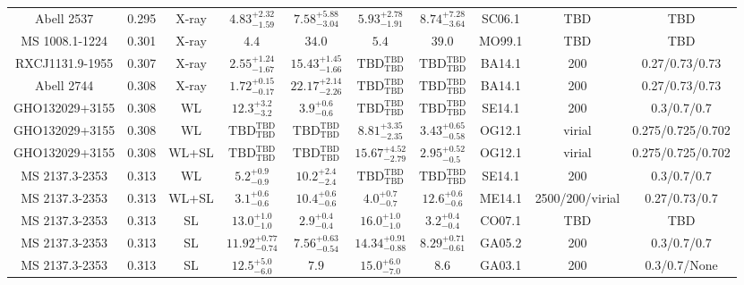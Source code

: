 \begin{table}
\begin{tabular}{cccccccccc}
Abell 2537 & 0.295 & X-ray & ${4.83}^{+2.32}_{-1.59}$ & ${7.58}^{+5.88}_{-3.04}$ & ${5.93}^{+2.78}_{-1.91}$ & ${8.74}^{+7.28}_{-3.64}$ & SC06.1 & TBD & TBD \\
MS 1008.1-1224 & 0.301 & X-ray & ${4.4}^{}_{}$ & ${34.0}^{}_{}$ & ${5.4}^{}_{}$ & ${39.0}^{}_{}$ & MO99.1 & TBD & TBD \\
RXCJ1131.9-1955 & 0.307 & X-ray & ${2.55}^{+1.24}_{-1.67}$ & ${15.43}^{+1.45}_{-1.66}$ & ${\mathrm{TBD}}^{\mathrm{TBD}}_{\mathrm{TBD}}$ & ${\mathrm{TBD}}^{\mathrm{TBD}}_{\mathrm{TBD}}$ & BA14.1 & 200 & 0.27/0.73/0.73 \\
Abell 2744 & 0.308 & X-ray & ${1.72}^{+0.15}_{-0.17}$ & ${22.17}^{+2.14}_{-2.26}$ & ${\mathrm{TBD}}^{\mathrm{TBD}}_{\mathrm{TBD}}$ & ${\mathrm{TBD}}^{\mathrm{TBD}}_{\mathrm{TBD}}$ & BA14.1 & 200 & 0.27/0.73/0.73 \\
GHO132029+3155 & 0.308 & WL & ${12.3}^{+3.2}_{-3.2}$ & ${3.9}^{+0.6}_{-0.6}$ & ${\mathrm{TBD}}^{\mathrm{TBD}}_{\mathrm{TBD}}$ & ${\mathrm{TBD}}^{\mathrm{TBD}}_{\mathrm{TBD}}$ & SE14.1 & 200 & 0.3/0.7/0.7 \\
GHO132029+3155 & 0.308 & WL & ${\mathrm{TBD}}^{\mathrm{TBD}}_{\mathrm{TBD}}$ & ${\mathrm{TBD}}^{\mathrm{TBD}}_{\mathrm{TBD}}$ & ${8.81}^{+3.35}_{-2.35}$ & ${3.43}^{+0.65}_{-0.58}$ & OG12.1 & virial & 0.275/0.725/0.702 \\
GHO132029+3155 & 0.308 & WL+SL & ${\mathrm{TBD}}^{\mathrm{TBD}}_{\mathrm{TBD}}$ & ${\mathrm{TBD}}^{\mathrm{TBD}}_{\mathrm{TBD}}$ & ${15.67}^{+4.52}_{-2.79}$ & ${2.95}^{+0.52}_{-0.5}$ & OG12.1 & virial & 0.275/0.725/0.702 \\
MS 2137.3-2353 & 0.313 & WL & ${5.2}^{+0.9}_{-0.9}$ & ${10.2}^{+2.4}_{-2.4}$ & ${\mathrm{TBD}}^{\mathrm{TBD}}_{\mathrm{TBD}}$ & ${\mathrm{TBD}}^{\mathrm{TBD}}_{\mathrm{TBD}}$ & SE14.1 & 200 & 0.3/0.7/0.7 \\
MS 2137.3-2353 & 0.313 & WL+SL & ${3.1}^{+0.6}_{-0.6}$ & ${10.4}^{+0.6}_{-0.6}$ & ${4.0}^{+0.7}_{-0.7}$ & ${12.6}^{+0.6}_{-0.6}$ & ME14.1 & 2500/200/virial & 0.27/0.73/0.7 \\
MS 2137.3-2353 & 0.313 & SL & ${13.0}^{+1.0}_{-1.0}$ & ${2.9}^{+0.4}_{-0.4}$ & ${16.0}^{+1.0}_{-1.0}$ & ${3.2}^{+0.4}_{-0.4}$ & CO07.1 & TBD & TBD \\
MS 2137.3-2353 & 0.313 & SL & ${11.92}^{+0.77}_{-0.74}$ & ${7.56}^{+0.63}_{-0.54}$ & ${14.34}^{+0.91}_{-0.88}$ & ${8.29}^{+0.71}_{-0.61}$ & GA05.2 & 200 & 0.3/0.7/0.7 \\
MS 2137.3-2353 & 0.313 & SL & ${12.5}^{+5.0}_{-6.0}$ & ${7.9}^{}_{}$ & ${15.0}^{+6.0}_{-7.0}$ & ${8.6}^{}_{}$ & GA03.1 & 200 & 0.3/0.7/None \\

\end{tabular}
\end{table}
